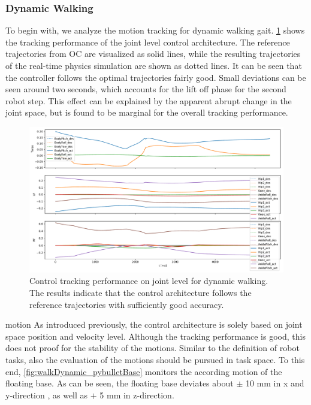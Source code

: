 \subsubsection{Dynamic Walking}
To begin with, we analyze the motion tracking for dynamic walking gait. \cref{fig:walkDynamic_pybulletTracking} shows the tracking performance of the joint level control architecture. The reference trajectories from \gls{OC} are visualized as solid lines, while the resulting trajectories of the real-time physics simulation are shown as dotted lines. It can be seen that the controller follows the optimal trajectories fairly good. Small deviations can be seen around two seconds, which accounts for the lift off phase for the second robot step. This effect can be explained by the apparent abrupt change in the joint space, but is found to be marginal for the overall tracking performance. 
\begin{figure}[h!]
\centering	
\includegraphics[width=1\textwidth]{fig/walkDynamic/pybullet/pybulletTracking}
\caption[Control tracking performance on joint level for dynamic walking]{Control tracking performance on joint level for dynamic walking. The results indicate that the control architecture follows the reference trajectories with sufficiently good accuracy.}
\label{fig:walkDynamic_pybulletTracking}
\end{figure}
motion 
As introduced previously, the control architecture is solely based on joint space position and velocity level. Although the tracking performance is good, this does not proof for the stability of the motions. Similar to the definition of robot tasks, also the evaluation of the motions should be pursued in task space. To this end, \cref{fig:walkDynamic_pybulletBase} monitors the according motion of the floating base. As can be seen, the floating base deviates about $\pm$ 10 mm in x and y-direction , as well as $+$ 5 mm in z-direction. 
